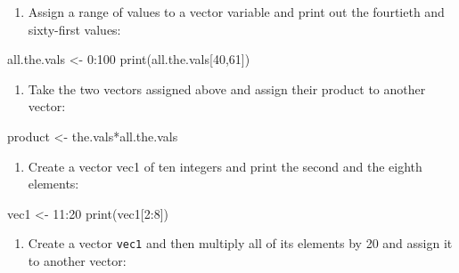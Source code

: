 \documentclass[
  letterpaper,
  DIV=11,
  numbers=noendperiod]{scrreprt}
\newenvironment{Shaded}{\begin{snugshade}}{\end{snugshade}}
\newcommand{\DecValTok}[1]{\textcolor[rgb]{0.68,0.00,0.00}{#1}}
\newcommand{\FunctionTok}[1]{\textcolor[rgb]{0.28,0.35,0.67}{#1}}
\newcommand{\NormalTok}[1]{\textcolor[rgb]{0.00,0.23,0.31}{#1}}
\newcommand{\OtherTok}[1]{\textcolor[rgb]{0.00,0.23,0.31}{#1}}
\newcommand{\SpecialCharTok}[1]{\textcolor[rgb]{0.37,0.37,0.37}{#1}}
\providecommand{\tightlist}{%
  \setlength{\itemsep}{0pt}\setlength{\parskip}{0pt}}\usepackage{longtable,booktabs,array}
\begin{document}
\begin{enumerate}
\def\labelenumi{\arabic{enumi}.}
\setcounter{enumi}{2}
\tightlist
\item
  Assign a range of values to a vector variable and print out the
  fourtieth and sixty-first values:
\end{enumerate}

\begin{Shaded}
\begin{Highlighting}[]
\NormalTok{all.the.vals }\OtherTok{\textless{}{-}} \DecValTok{0}\SpecialCharTok{:}\DecValTok{100}
\FunctionTok{print}\NormalTok{(all.the.vals[}\DecValTok{40}\NormalTok{,}\DecValTok{61}\NormalTok{])}
\end{Highlighting}
\end{Shaded}

\begin{enumerate}
\def\labelenumi{\arabic{enumi}.}
\setcounter{enumi}{3}
\tightlist
\item
  Take the two vectors assigned above and assign their product to
  another vector:
\end{enumerate}

\begin{Shaded}
\begin{Highlighting}[]
\NormalTok{product }\OtherTok{\textless{}{-}}\NormalTok{ the.vals}\SpecialCharTok{*}\NormalTok{all.the.vals}
\end{Highlighting}
\end{Shaded}

\begin{enumerate}
\def\labelenumi{\arabic{enumi}.}
\setcounter{enumi}{4}
\tightlist
\item
  Create a vector vec1 of ten integers and print the second and the
  eighth elements:
\end{enumerate}

\begin{Shaded}
\begin{Highlighting}[]
\NormalTok{vec1 }\OtherTok{\textless{}{-}} \DecValTok{11}\SpecialCharTok{:}\DecValTok{20} 
\FunctionTok{print}\NormalTok{(vec1[}\DecValTok{2}\SpecialCharTok{:}\DecValTok{8}\NormalTok{])}
\end{Highlighting}
\end{Shaded}

\begin{enumerate}
\def\labelenumi{\arabic{enumi}.}
\setcounter{enumi}{5}
\tightlist
\item
  Create a vector \texttt{vec1} and then multiply all of its elements by
  20 and assign it to another vector:
\end{enumerate}
\end{document}
